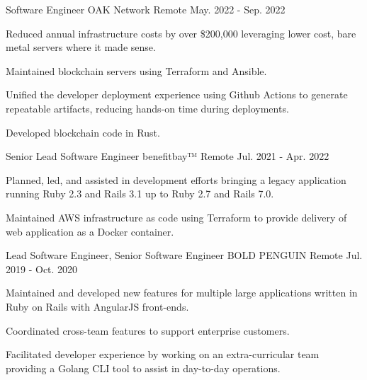 

\begin{cventries}

  \cventry
    {Software Engineer} %
    {OAK Network} %
    {Remote} %
    {May. 2022 - Sep. 2022} %
    {
      \begin{cvitems} %
        \item {Reduced annual infrastructure costs by over \$200,000 leveraging lower cost, bare metal servers where it made sense.}
        \item {Maintained blockchain servers using Terraform and Ansible.}
        \item {Unified the developer deployment experience using Github Actions to generate repeatable artifacts, reducing hands-on time during deployments.}
        \item {Developed blockchain code in Rust.}
      \end{cvitems}
    }

  \cventry
    {Senior Lead Software Engineer} %
    {benefitbay™} %
    {Remote} %
    {Jul. 2021 - Apr. 2022} %
    {
      \begin{cvitems} %
        \item {Planned, led, and assisted in development efforts bringing a legacy application running Ruby 2.3 and Rails 3.1 up to Ruby 2.7 and Rails 7.0.}
        \item {Maintained AWS infrastructure as code using Terraform to provide delivery of web application as a Docker container.}
      \end{cvitems}
    }

  \cventry
    {Lead Software Engineer, Senior Software Engineer} %
    {BOLD PENGUIN} %
    {Remote} %
    {Jul. 2019 - Oct. 2020} %
    {
      \begin{cvitems} %
        \item {Maintained and developed new features for multiple large applications written in Ruby on Rails with AngularJS front-ends.}
        \item {Coordinated cross-team features to support enterprise customers.}
        \item {Facilitated developer experience by working on an extra-curricular team providing a Golang CLI tool to assist in day-to-day operations.}
      \end{cvitems}
    }


\end{cventries}
